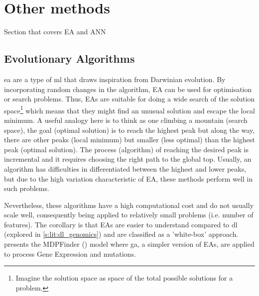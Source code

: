 \section{Other methods}

Section that covers EA and ANN
\subsection{Evolutionary Algorithms} \label{s:lit:ea_overview}


\acrlong{ea} are a type of \acrshort{ml} that draws inspiration from Darwinian evolution. By incorporating random changes in the algorithm, EA can be used for optimisation or search problems. Thus, EAs are suitable for doing a wide search of the solution space\footnote{Imagine the solution space as space of the total possible solutions for a problem.} which means that they might find an unusual solution and escape the local minimum. A useful analogy here is to think as one climbing a mountain (search space), the goal (optimal solution) is to reach the highest peak but along the way, there are other peaks (local minimum) but smaller (less optimal) than the highest peak (optimal solution). The process (algorithm) of reaching the desired peak is incremental and it requires choosing the right path to the global top. Usually, an algorithm has difficulties in differentiated between the highest and lower peaks, but due to the high variation characteristic of EA, these methods perform well in such problems.


Nevertheless, these algorithms have a high computational cost and do not usually scale well, consequently being applied to relatively small problems (i.e. number of features). The corollary is that EAs are easier to understand compared to  \acrfull{dl} (explored in \cref{s:lit:dl_genomics}) and are classified as a 'white-box' approach.  presents the MDPFinder (\citet{Zhao2012-wj}) model where \acrfull{ga}, a simpler version of EAs, are applied to process Gene Expression and mutations.


